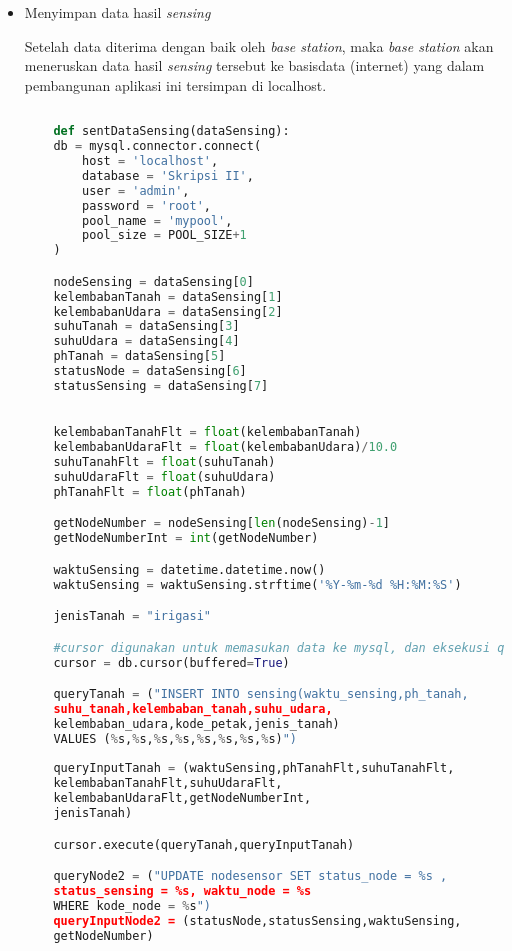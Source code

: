 \begin{itemize}
\begin{lstlisting}[label=getDataSensing, language=Python, caption=Metode getDataSensing(), numbers=none]
        \end{lstlisting}
       
       \item Menyimpan data hasil \textit{sensing}
       
        Setelah data diterima dengan baik oleh \textit{base station}, maka \textit{base station} akan meneruskan data hasil \textit{sensing} tersebut ke basisdata (internet) yang dalam pembangunan aplikasi ini tersimpan di localhost.
    
    \begin{lstlisting}[label=sentDataSensing, language=Python, caption=Metode sentDataSensing(), numbers=none]
    
    def sentDataSensing(dataSensing):
    db = mysql.connector.connect(
        host = 'localhost',
        database = 'Skripsi II',
        user = 'admin',
        password = 'root',
        pool_name = 'mypool',
        pool_size = POOL_SIZE+1
    )

    nodeSensing = dataSensing[0]
    kelembabanTanah = dataSensing[1]
    kelembabanUdara = dataSensing[2]
    suhuTanah = dataSensing[3]
    suhuUdara = dataSensing[4]
    phTanah = dataSensing[5]
    statusNode = dataSensing[6]
    statusSensing = dataSensing[7]
    

    kelembabanTanahFlt = float(kelembabanTanah)
    kelembabanUdaraFlt = float(kelembabanUdara)/10.0
    suhuTanahFlt = float(suhuTanah)
    suhuUdaraFlt = float(suhuUdara)
    phTanahFlt = float(phTanah)

    getNodeNumber = nodeSensing[len(nodeSensing)-1]
    getNodeNumberInt = int(getNodeNumber)

    waktuSensing = datetime.datetime.now()
    waktuSensing = waktuSensing.strftime('%Y-%m-%d %H:%M:%S')

    jenisTanah = "irigasi"

    #cursor digunakan untuk memasukan data ke mysql, dan eksekusi query
    cursor = db.cursor(buffered=True)

    queryTanah = ("INSERT INTO sensing(waktu_sensing,ph_tanah,
    suhu_tanah,kelembaban_tanah,suhu_udara,
    kelembaban_udara,kode_petak,jenis_tanah) 
    VALUES (%s,%s,%s,%s,%s,%s,%s,%s)")
    
    queryInputTanah = (waktuSensing,phTanahFlt,suhuTanahFlt,
    kelembabanTanahFlt,suhuUdaraFlt,
    kelembabanUdaraFlt,getNodeNumberInt,
    jenisTanah)

    cursor.execute(queryTanah,queryInputTanah)

    queryNode2 = ("UPDATE nodesensor SET status_node = %s ,
    status_sensing = %s, waktu_node = %s 
    WHERE kode_node = %s")
    queryInputNode2 = (statusNode,statusSensing,waktuSensing,
    getNodeNumber)


\end{lstlisting}
\end{itemize}
